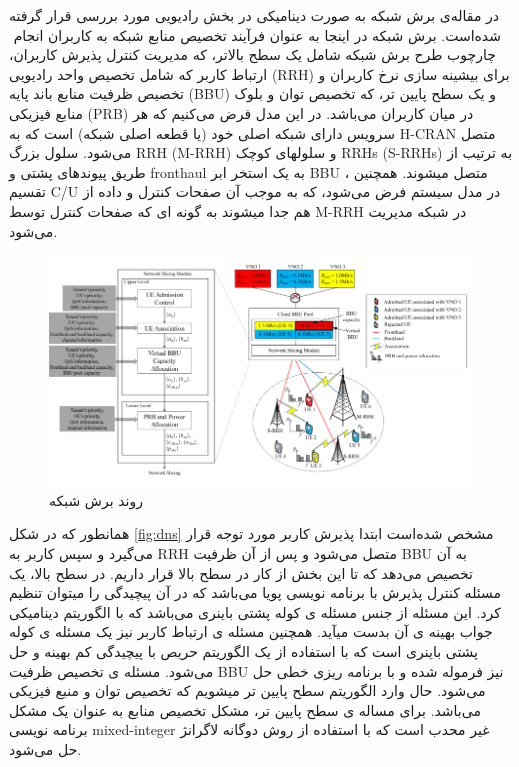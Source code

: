 در مقاله‌ی \cite{lee2018dynamic}
برش شبکه به صورت دینامیکی در بخش رادیویی مورد بررسی قرار گرفته شده‌است.
برش شبکه در اینجا به عنوان فرآیند تخصیص منابع شبکه به کاربران انجام ‌
چارچوب طرح برش شبکه شامل یک سطح بالاتر، که مدیریت کنترل پذیرش کاربران، ارتباط کاربر که شامل تخصیص واحد رادیویی (RRH) برای بیشینه سازی نرخ کاربران و تخصیص ظرفیت منابع باند پایه (‌BBU) و یک سطح پایین تر، که تخصیص توان و بلوک منابع فیزیکی (PRB) در میان کاربران می‌باشد.
در این مدل فرض می‌کنیم که هر سرویس دارای شبکه اصلی خود (یا قطعه اصلی شبکه) است که به H-CRAN متصل می‌شود.
سلول بزرگ RRH (M-RRH) و سلولهای کوچک RRHs (S-RRHs) به ترتیب از طریق پیوندهای پشتی و fronthaul به یک استخر ابر
BBU  متصل میشوند.
همچنین ، تقسیم C/U در مدل سیستم فرض می‌شود، که به موجب آن صفحات کنترل و داده از هم جدا میشوند به گونه ای که صفحات کنترل توسط M-RRH در شبکه مدیریت می‌شود.
\begin{figure}%
  \centering
    \includegraphics[scale = 0.7]{./fig/dynamicNS}
  \caption{روند برش شبکه\ \cite{lee2018dynamic}}
  \label{fig:dns}
\end{figure}
همانطور که در شکل \eqref{fig:dns} 
مشخص شده‌است ابتدا پذیرش کاربر مورد توجه قرار می‌گیرد و سپس کاربر به RRH متصل می‌شود و پس از آن ظرفیت BBU به آن تخصیص می‌دهد که تا این بخش از کار در سطح بالا قرار داریم.
در سطح بالا، یک مسئله کنترل پذیرش با برنامه نویسی پویا می‌باشد که در آن پیچیدگی را میتوان تنظیم کرد.
این مسئله از جنس مسئله ی
کوله پشتی 
باینری
 می‌باشد که با الگوریتم دینامیکی جواب بهینه ی آن بدست میآید.
همچنین مسئله ی ارتباط کاربر نیز یک مسئله ی کوله پشتی باینری است که با استفاده از یک الگوریتم حریص با پیچیدگی کم بهینه و حل می‌شود.
 مسئله ی تخصیص ظرفیت BBU نیز فرموله شده و با برنامه ریزی خطی حل می‌شود.
 حال وارد الگوریتم سطح پایین تر میشویم که تخصیص توان و منبع فیزیکی می‌باشد.
برای مساله ی سطح پایین تر، مشکل تخصیص منابع به عنوان یک مشکل برنامه نویسی mixed-integer غیر محدب است که با استفاده از روش دوگانه لاگرانژ حل می‌شود.

